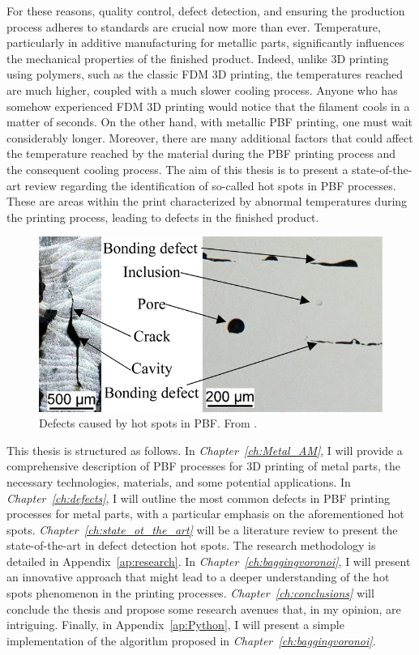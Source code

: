 For these reasons, quality control, defect detection, and ensuring the production process adheres to standards are crucial now more than ever. 
Temperature, particularly in additive manufacturing for metallic parts, significantly influences the mechanical properties of the finished product. Indeed, unlike 3D printing using polymers, such as the classic FDM 3D printing, the temperatures reached are much higher, coupled with a much slower cooling process. Anyone who has somehow experienced FDM 3D printing would notice that the filament cools in a matter of seconds. On the other hand, with metallic PBF printing, one must wait considerably longer. Moreover, there are many additional factors that could affect the temperature reached by the material during the PBF printing process and the consequent cooling process.
The aim of this thesis is to present a state-of-the-art review regarding the identification of so-called hot spots in PBF processes. These are areas within the print characterized by abnormal temperatures during the printing process, leading to defects in the finished product.
\begin{figure}[H]
    \centering
    \includegraphics[scale=3.5]{Images/defect.jpeg}
    \caption[Defects in metal AM.]{Defects caused by hot spots in PBF. From \citeauthor{bernhard_defect_2020}.}
    \label{fig:defect}
\end{figure}

This thesis is structured as follows. In \emph{Chapter~\ref{ch:Metal_AM}}, I will provide a comprehensive description of PBF processes for 3D printing of metal parts, the necessary technologies, materials, and some potential applications. In \emph{Chapter~\ref{ch:defects}}, I will outline the most common defects in PBF printing processes for metal parts, with a particular emphasis on the aforementioned hot spots. \emph{Chapter~\ref{ch:state_ot_the_art}} will be a literature review to present the state-of-the-art in defect detection hot spots. The research methodology is detailed in Appendix~\ref{ap:research}. In \emph{Chapter~\ref{ch:baggingvoronoi}}, I will present an innovative approach that might lead to a deeper understanding of the hot spots phenomenon in the printing processes. \emph{Chapter~\ref{ch:conclusions}} will conclude the thesis and propose some research avenues that, in my opinion, are intriguing. Finally, in Appendix~\ref{ap:Python}, I will present a simple implementation of the algorithm proposed in \emph{Chapter~\ref{ch:baggingvoronoi}.}
